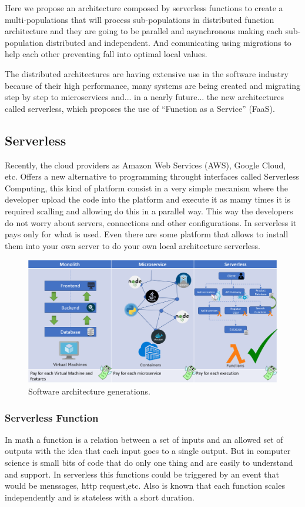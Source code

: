 \documentclass[runningheads]{llncs}
\begin{document}
Here we propose an architecture composed by serverless functions to create a multi-populations that
will process sub-populations in distributed function architecture and they are going to be parallel and asynchronous
making each sub-population distributed and independent. And comunicating using migrations to help each other 
preventing fall into optimal local values.

The distributed architectures are having extensive use in the software
industry because of their high performance, many systems are being
created and migrating step by step to microservices and... in a nearly
future... the new architectures called serverless, which proposes the
use of “Function as a Service” (FaaS).


\subsection{Serverless}
Recently, the cloud providers as Amazon Web Services (AWS), Google Cloud, etc. Offers a new alternative to programming throught interfaces called Serverless Computing,
this kind of platform consist in a very simple mecanism where the developer upload the code into the platform and 
execute it as mamy times it is required scalling and allowing do this in a parallel way. This way the developers do not worry about servers, connections and other configurations.
In serverless it pays only for what is used. Even there are some platform that allows to install them into your own server to do your own local architecture serverless.

\begin{figure}[htp]
  \includegraphics[width=\textwidth]{architectures.png}
  \caption{Software architecture generations.} \label{fig1}
  \end{figure}

\subsubsection{Serverless Function} 
In math a function is a relation between a set of inputs and an allowed set of outputs with
the idea that each input goes to a single output. But in computer science is small bits of code 
that do only one thing and are easily to understand
and support. In serverless this functions could be triggered by an event that would be menssages, http request,etc.
Also is known that each function scales independently and is stateless with a short duration.
\end{document}
